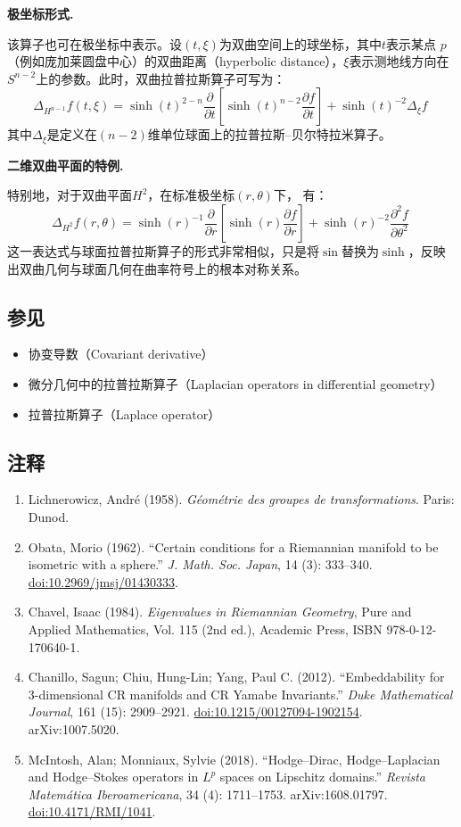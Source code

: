 \textbf{极坐标形式.}

该算子也可在极坐标中表示。设$(t, \xi)$为双曲空间上的球坐标，其中$t$表示某点 $p$（例如庞加莱圆盘中心）的双曲距离（hyperbolic distance），$\xi$表示测地线方向在$S^{n-2}$上的参数。此时，双曲拉普拉斯算子可写为：
\[
\Delta_{H^{n-1}} f(t, \xi)
= \sinh(t)^{2-n}
  \frac{\partial}{\partial t}
  \left[ \sinh(t)^{n-2} \frac{\partial f}{\partial t} \right]
+ \sinh(t)^{-2} \Delta_{\xi} f~
\]
其中$\Delta_{\xi}$是定义在$(n-2)$维单位球面上的拉普拉斯–贝尔特拉米算子。

\textbf{二维双曲平面的特例.}

特别地，对于双曲平面$H^{2}$，在标准极坐标$(r, \theta)$下，
有：
\[
\Delta_{H^{2}} f(r, \theta)
= \sinh(r)^{-1}
  \frac{\partial}{\partial r}
  \left[ \sinh(r) \frac{\partial f}{\partial r} \right]
+ \sinh(r)^{-2}
  \frac{\partial^{2} f}{\partial \theta^{2}}~
\]
这一表达式与球面拉普拉斯算子的形式非常相似，只是将$\sin$替换为$\sinh$，反映出双曲几何与球面几何在曲率符号上的根本对称关系。
\subsection{参见}
\begin{itemize}
  \item 协变导数（Covariant derivative）
  \item 微分几何中的拉普拉斯算子（Laplacian operators in differential geometry）
  \item 拉普拉斯算子（Laplace operator）
\end{itemize}
\subsection{注释}
\begin{enumerate}
  \item Lichnerowicz, André (1958). \textit{Géométrie des groupes de transformations}. Paris: Dunod.
  \item Obata, Morio (1962). “Certain conditions for a Riemannian manifold to be isometric with a sphere.” \textit{J. Math. Soc. Japan}, 14 (3): 333–340. \href{https://doi.org/10.2969/jmsj/01430333}{doi:10.2969/jmsj/01430333}.
  \item Chavel, Isaac (1984). \textit{Eigenvalues in Riemannian Geometry}, Pure and Applied Mathematics, Vol. 115 (2nd ed.), Academic Press, ISBN 978-0-12-170640-1.
  \item Chanillo, Sagun; Chiu, Hung-Lin; Yang, Paul C. (2012). “Embeddability for 3-dimensional CR manifolds and CR Yamabe Invariants.” \textit{Duke Mathematical Journal}, 161 (15): 2909–2921. \href{https://doi.org/10.1215/00127094-1902154}{doi:10.1215/00127094-1902154}. arXiv:1007.5020.
  \item McIntosh, Alan; Monniaux, Sylvie (2018). “Hodge–Dirac, Hodge–Laplacian and Hodge–Stokes operators in $L^p$ spaces on Lipschitz domains.” \textit{Revista Matemática Iberoamericana}, 34 (4): 1711–1753. arXiv:1608.01797. \href{https://doi.org/10.4171/RMI/1041}{doi:10.4171/RMI/1041}.
\end{enumerate}
